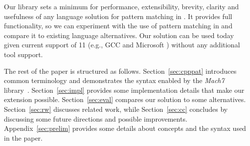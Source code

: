 

\noindent
Our library sets a minimum for performance, extensibility, brevity, 
clarity and usefulness of any language solution for pattern matching 
in \Cpp{}. It provides full functionality, so we can experiment with the use of 
pattern matching in \Cpp{} and compare it to existing language alternatives.
Our solution can be used today given 
current support of \Cpp{}11 (e.g., GCC and Microsoft \Cpp{}) without any 
additional tool support.

The rest of the paper is structured as follows. Section~\ref{sec:cpppat} 
introduces common terminology and demonstrates the syntax enabled by the 
\emph{Mach7} library~\cite{TS12}. Section~\ref{sec:impl} provides some 
implementation details that make our extension possible. Section~\ref{sec:eval} 
compares our solution to some alternatives. Section~\ref{sec:rw} discusses 
related work, while Section~\ref{sec:cc} concludes by discussing some future 
directions and possible improvements. Appendix~\ref{sec:prelim} provides some 
details about \Cpp{} concepts and the syntax used in the paper.
